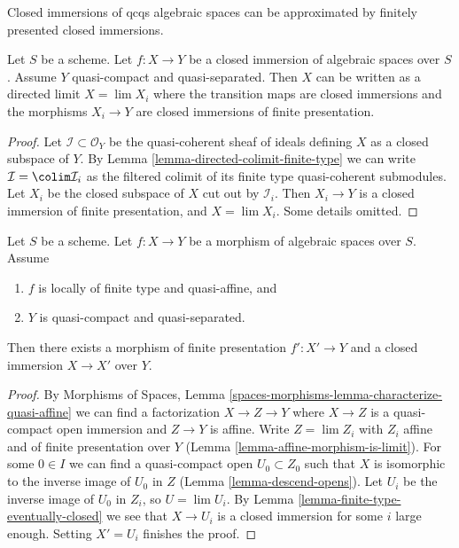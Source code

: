 \begin{lemma}
\label{lemma-closed-is-limit-closed-and-finite-presentation}
\begin{slogan}
Closed immersions of qcqs algebraic spaces can be approximated
by finitely presented closed immersions.
\end{slogan}
Let $S$ be a scheme. Let $f : X \to Y$ be a closed immersion of algebraic
spaces over $S$. Assume $Y$ quasi-compact and quasi-separated.
Then $X$ can be written as a directed limit $X = \lim X_i$
where the transition maps are closed immersions and the morphisms
$X_i \to Y$ are closed immersions of finite presentation.
\end{lemma}

\begin{proof}
Let $\mathcal{I} \subset \mathcal{O}_Y$ be the quasi-coherent sheaf
of ideals defining $X$ as a closed subspace of $Y$. By
Lemma \ref{lemma-directed-colimit-finite-type}
we can write $\mathcal{I} = \colim \mathcal{I}_i$ as the
filtered colimit of its finite type quasi-coherent submodules.
Let $X_i$ be the closed subspace of $X$ cut out by $\mathcal{I}_i$.
Then $X_i \to Y$ is a closed immersion of finite presentation,
and $X = \lim X_i$. Some details omitted.
\end{proof}

\begin{lemma}
\label{lemma-quasi-affine-closed-in-finite-presentation}
Let $S$ be a scheme. Let $f : X \to Y$ be a morphism of algebraic spaces
over $S$. Assume
\begin{enumerate}
\item $f$ is locally of finite type and quasi-affine, and
\item $Y$ is quasi-compact and quasi-separated.
\end{enumerate}
Then there exists a morphism of finite presentation
$f' : X' \to Y$ and a closed immersion $X \to X'$ over $Y$.
\end{lemma}

\begin{proof}
By Morphisms of Spaces, Lemma
\ref{spaces-morphisms-lemma-characterize-quasi-affine}
we can find a factorization $X \to Z \to Y$ where
$X \to Z$ is a quasi-compact open immersion and
$Z \to Y$ is affine. Write $Z = \lim Z_i$ with $Z_i$ affine and
of finite presentation over $Y$ (Lemma \ref{lemma-affine-morphism-is-limit}).
For some $0 \in I$ we can find a quasi-compact open $U_0 \subset Z_0$
such that $X$ is isomorphic to the inverse image of $U_0$ in $Z$
(Lemma \ref{lemma-descend-opens}). Let $U_i$ be the inverse image of
$U_0$ in $Z_i$, so $U = \lim U_i$. By
Lemma \ref{lemma-finite-type-eventually-closed}
we see that $X \to U_i$ is a closed immersion for some $i$ large enough.
Setting $X' = U_i$ finishes the proof.
\end{proof}

